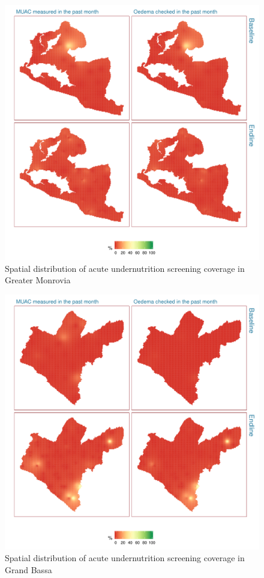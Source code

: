 \documentclass[12pt,a4paper]{article}
\begin{document}
\begin{figure}[H]

{\centering \includegraphics[width=0.65\linewidth]{liberiaCoverageFinalReport_files/figure-latex/screen1map-1} 

}

\caption{Spatial distribution of acute undernutrition screening coverage in Greater Monrovia}\label{fig:screen1map}
\end{figure}

\begin{figure}[H]

{\centering \includegraphics[width=0.65\linewidth]{liberiaCoverageFinalReport_files/figure-latex/screen2map-1} 

}

\caption{Spatial distribution of acute undernutrition screening coverage in Grand Bassa}\label{fig:screen2map}
\end{figure}
\end{document}
